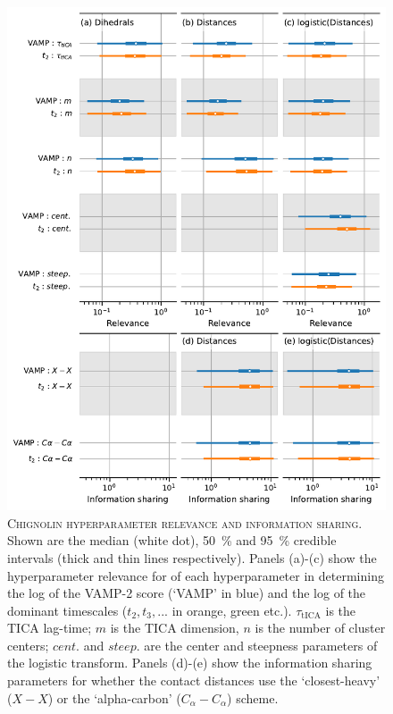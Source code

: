 \documentclass{article}
\begin{document}
\begin{figure}[h]
    \centering
    \includegraphics[height=0.8\textheight]{figures/sensitivities/cln025_sensitivity.pdf}
    \caption{\textsc{Chignolin hyperparameter relevance and information sharing}. Shown are the  median (white dot), \SI{50}{\percent} and \SI{95}{\percent} credible intervals (thick and thin lines respectively).  Panels (a)-(c) show the hyperparameter relevance for of each hyperparameter in determining the log of the VAMP-2 score (`VAMP' in blue) and the log of the dominant timescales ($t_{2}, t_{3}, ...$ in orange, green etc.). $\tau_{\mathrm{tICA}}$ is the TICA lag-time; $m$ is the TICA dimension, $n$ is the number of cluster centers; $cent.$ and $steep.$ are the center and steepness parameters of the logistic transform. Panels (d)-(e) show the information sharing parameters for whether the contact distances use the `closest-heavy' ($X-X$) or the `alpha-carbon' ($C_{\alpha}-C_{\alpha}$) scheme.  }
    \label{fig:cln025_sense}
\end{figure}
\end{document}

